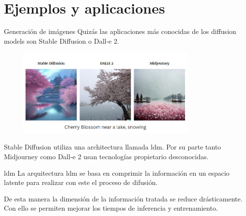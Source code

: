 \section{Ejemplos y aplicaciones}

\begin{frame}{Generación de imágenes}
Quizás las aplicaciones más conocidas de los \alert{diffusion models} son \alert{Stable Diffusion} o \alert{Dall-e 2}.

\begin{figure}
    \centering
    \includegraphics[width=0.8\textwidth]{figures/Diffusion_Models/Stable_Diffusion_Dalle.png}
    \caption{\cite{SD_vs_DE_vs_MJ}}
\end{figure}

Stable Diffusion utiliza una architectura llamada \alert{\gls{ldm}}. Por su parte tanto Midjourney como Dall-e 2 usan tecnologías propietario desconocidas.
\end{frame}

\begin{frame}{\acrlong{ldm}}
La arquitectura \gls{ldm} \cite{rombach2022high} se basa en \alert{comprimir la información} en un espacio latente para realizar con este el proceso de difusión.

De esta manera la \alert{dimensión} de la información tratada se reduce drásticamente. Con ello se permiten mejorar los tiempos de inferencia y entrenamiento.
\end{frame}


